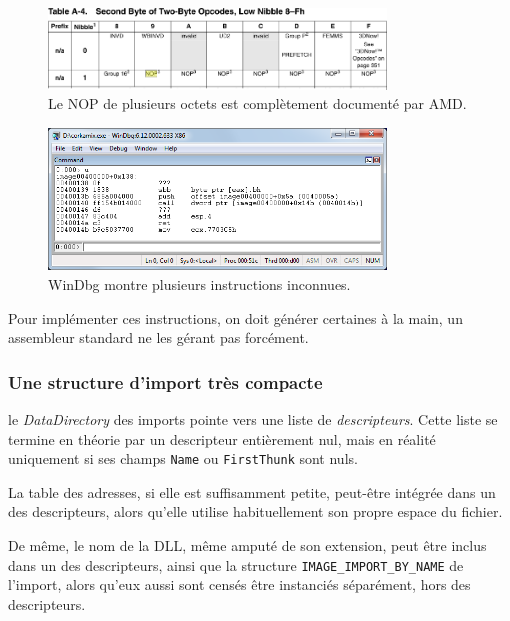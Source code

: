 \begin{figure}[ht]
  \centering
  \includegraphics[width=0.8\textwidth]{albertini/img/nop_amd}
  \caption{Le NOP de plusieurs octets est complètement documenté par AMD.}
  \label{fig:albertini:nop_amd}
\end{figure}

\begin{figure}[p]
  \centering
  \includegraphics[width=0.8\textwidth]{albertini/img/corkamix_windbg}
  \caption{WinDbg montre plusieurs instructions inconnues.}
  \label{fig:albertini:corkamix_windbg}
\end{figure}

Pour implémenter ces instructions, on doit générer certaines à la main, un assembleur standard ne les gérant pas forcément.

\subsubsection*{Une structure d'import très compacte}

le \emph{DataDirectory} des imports pointe vers une liste de \emph{descripteurs}.
Cette liste se termine en théorie par un descripteur entièrement nul, mais en réalité uniquement si ses champs \texttt{Name} ou \texttt{FirstThunk} sont nuls.

La table des adresses, si elle est suffisamment petite, peut-être intégrée dans un des descripteurs, alors qu'elle utilise habituellement son propre espace du fichier.

De même, le nom de la DLL, même amputé de son extension, peut être inclus dans un des descripteurs, ainsi que la structure \texttt{IMAGE\_IMPORT\_BY\_NAME} de l'import, alors qu'eux aussi sont censés être instanciés séparément, hors des descripteurs.

